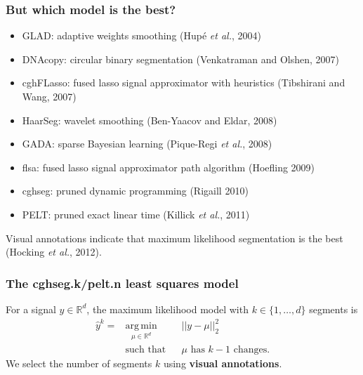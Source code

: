 \documentclass{beamer}
\newcommand{\argmin}{\operatorname*{arg\, min}}
\newcommand{\RR}{\mathbb R}
\begin{document}
\begin{frame}
  \frametitle{But which model is the best?}
  \begin{itemize}
  \item GLAD: adaptive weights smoothing (Hup\'e \emph{et al.}, 2004)
  \item DNAcopy: circular binary segmentation (Venkatraman and Olshen,
    2007)
  \item cghFLasso: fused lasso signal approximator with heuristics
    (Tibshirani and Wang, 2007)
  \item HaarSeg: wavelet smoothing (Ben-Yaacov and Eldar, 2008)
  \item GADA: sparse Bayesian learning (Pique-Regi \emph{et al.}, 2008)
  \item flsa: fused lasso signal approximator path algorithm (Hoefling 2009)
  \item \alert<2>{cghseg: pruned dynamic programming (Rigaill 2010)}
  \item \alert<2>{PELT: pruned exact linear time (Killick \emph{et al.}, 2011)}
  \end{itemize}
  \alert<2>{Visual annotations indicate that maximum likelihood
    segmentation is the best (Hocking \emph{et al.}, 2012).}
  \end{frame}

  \begin{frame}
    \frametitle{The cghseg.k/pelt.n least squares model}
    For a signal $y\in\RR^d$, the maximum
    likelihood model with $k\in\{1,\dots,d\}$ segments is
    $$
    \begin{aligned}
 \hat y^k=     &\argmin_{\mu\in\RR^d} && ||y-\mu||^2_2\\
      &\text{such that} && \text{$\mu$ has $k-1$ changes.}
    \end{aligned}
    $$
    We select the number of segments $k$ using \textbf{visual
      annotations}.
  \end{frame}
\end{document}
